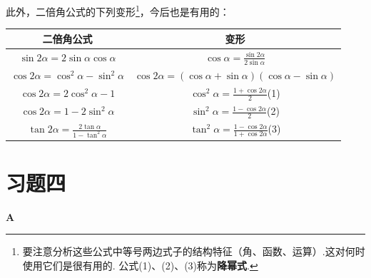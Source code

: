 此外，二倍角公式的下列变形\footnote{要注意分析这些公式中等号两边式子的结构特征（角、函数、运算）.这对何时使用它们是很有用的. 公式(1)、(2)、(3)称为\textbf{降幂式}.}，今后也是有用的：
\begin{center}
\begin{tabular}{c|c}
\hline
    二倍角公式  & 变形\\
\hline
$\sin2\alpha=2\sin\alpha\cos\alpha$ & $\cos\alpha=\frac{\sin2\alpha}{2\sin\alpha}$\\[1.5ex]
$\cos2\alpha=\cos^2\alpha-\sin^2\alpha$&$\cos2\alpha=(\cos\alpha+\sin\alpha)(\cos\alpha-\sin\alpha)$\\[1.5ex]
$\cos2\alpha=2\cos^2\alpha-1$ & $\cos^2\alpha=\frac{1+\cos2\alpha}{2}$\hfill(1)\\[1.5ex]
$\cos2\alpha=1-2\sin^2\alpha$ & $\sin^2\alpha=\frac{1-\cos2\alpha}{2}$\hfill(2)\\[1.5ex]
$\tan2\alpha=\frac{2\tan\alpha}{1-\tan^2\alpha}$&$\tan^2\alpha=\frac{1-\cos2\alpha}{1+\cos2\alpha}$\hfill(3)\\[1.5ex]
\hline
\end{tabular}
\end{center}

\section*{习题四}
\begin{center}
    \bfseries A
\end{center}


